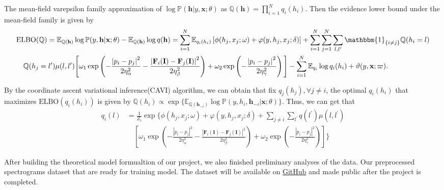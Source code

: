 \documentclass[10pt]{article}
\newcommand{\EE}{{\mathbb{E}}}
\newcommand{\PP}{{\mathbb{P}}}
\newcommand{\QQ}{{\mathbb{Q}}}
\newcommand{\Fb}{\mathbf{F}}
\newcommand{\Ib}{\mathbf{I}}
\newcommand{\hb}{\mathbf{h}}
\newcommand{\xb}{\mathbf{x}}
\newcommand{\one}{\mathbbm{1}}
\begin{document}
The mean-field varepsilon family approximation of
$\log\PP(\hb \vert y, \xb; \theta)$ as $\QQ(\hb) = \prod_{i=1}^N q_i(h_i)$.
Then the evidence lower bound under the mean-field family is given by
\vspace{-1cm}
\begin{equation*}
\begin{split}
& \textrm{ELBO}(\QQ) = \EE_{\QQ(\hb)} \log\PP(y, \hb \vert \xb; \theta)
- \EE_{\QQ(\hb)} \log q(\hb) = \sum_{i=1}^N \EE_{q_i(h_i)}
\left[ \phi(h_j, x_j; \omega) + \varphi(y, h_j, x_j; \delta) \right]
+ \sum_{i=1}^N \sum_{j=1}^N \sum_{l,l^\prime} \one_{\{i \neq j\}}\QQ(h_i = l) \\
&\quad \QQ(h_j = l^\prime) \mu(l, l^\prime)
\Bigg[ \omega_1 \exp \left(
- \frac{\left\lvert p_i - p_j \right\rvert^2}{2\eta_\alpha^2}
- \frac{\left\lvert \Fb_i(\Ib) - \Fb_j(\Ib) \right\rvert^2}{2\eta_\beta^2}
\right)
+ \omega_2 \exp \left(
- \frac{\left\lvert p_i - p_j \right\rvert^2}{2\eta_\gamma^2}
\right) \Bigg]
- \sum_{i=1}^N \EE_{q_i} \log q_i(h_i) + \vartheta(y, \xb; \varpi).
\end{split}
\end{equation*}


By the coordinate ascent variational inference(CAVI) algorithm,
we can obtain that fix $q_j(h_j), \forall j \neq i$, the optimal $q_i(h_i)$
that maximizes $\textrm{ELBO}(q_i(h_i))$ is given by
$\QQ(h_i) \propto \exp\{\EE_{\QQ(\hb_{-i})}
\log\PP(y, h_i, \hb_{-i} \vert \xb; \theta)\}$.
Thus, we can get that
\begin{equation*}
\begin{split}
q_i(l) &= \frac{1}{Z_i} \exp \Bigg\{
\phi(h_j, x_j; \omega) + \varphi(y, h_j, x_j; \delta)
+ \sum_{j \neq i} \sum_{l^\prime} q(l^\prime) \mu(l, l^\prime) \\
&\quad \left[ \omega_1 \exp \left(
- \frac{\left\lvert p_i - p_j \right\rvert^2}{2\eta_\alpha^2}
- \frac{\left\lvert \Fb_i(\Ib) - \Fb_j(\Ib) \right\rvert^2}{2\eta_\beta^2}
\right)
+ \omega_2 \exp \left(
- \frac{\left\lvert p_i - p_j 
\right\rvert^2}{2\eta_\gamma^2}
\right)
\right]
\Bigg\}
\end{split}
\end{equation*}


After building the theoretical model formualtion of our project, we also
finished preliminary analyses of the data. Our preprocessed spectrograms
dataset that are ready for training model. The dataset will be available on
\href{https://github.com/Carol-seven/UNet-CRF_EEG}{GitHub} and
made public after the project is completed.
\end{document}

